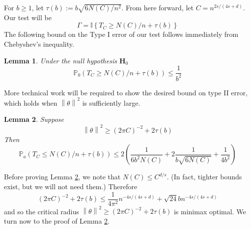 \documentclass{article}
\newcommand{\norm}[1]{\left\lVert#1\right\rVert}
\newcommand{\set}[1]{\left\{#1\right\}}
\newcommand{\1}{\mathbb{I}}
\newcommand{\Pbb}{\mathbb{P}}
\theoremstyle{alden}
\theoremstyle{aldenthm}
\newtheorem{lemma}{Lemma}
\theoremstyle{definition}
\theoremstyle{remark}
\begin{document}
For $b \geq 1$, let $\tau(b) := b \sqrt{6N(C)/n^2}$. From here forward, let $C = n^{2s/(4s + d)}$. Our test will be
\begin{equation*}
\Gamma = \1\set{T_C \geq N(C)/n + \tau(b)}
\end{equation*}
The following bound on the Type I error of our test follows immediately from Chebyshev's inequality.
\begin{lemma}
	Under the null hypothesis $\mathbf{H}_0$
	\begin{equation*}
	\Pbb_0(T_C \geq N(C)/n + \tau(b)) \leq \frac{1}{b^2}
	\end{equation*}
\end{lemma}

More technical work will be required to show the desired bound on type II error, which holds when $\norm{\theta}^2$ is sufficiently large.
\begin{lemma}
	\label{lem: type_2_error}
	Suppose
	\begin{equation*}
	\norm{\theta}^2 \geq (2\pi C)^{-2} + 2\tau(b)
	\end{equation*}
	Then
	\begin{equation*}
	\Pbb_{a}(T_C \leq N(C)/n + \tau(b)) \leq 2 \left(\frac{1}{6b^2N(C)} + 2\frac{1}{b\sqrt{6N(C)}} +  \frac{1}{4b^2}\right)
	\end{equation*}
\end{lemma}
Before proving Lemma \ref{lem: type_2_error}, we note that $N(C) \leq C^{d/s}$. (In fact, tighter bounds exist, but we will not need them.) Therefore
\begin{equation*}
(2\pi C)^{-2} + 2\tau(b) \leq \frac{1}{4\pi^2}n^{-4s/(4s + d)} + \sqrt{24}bn^{-4s/(4s + d)}
\end{equation*}
and so the critical radius $\norm{\theta}^2 \geq (2\pi C)^{-2} + 2\tau(b)$ is minimax optimal. We turn now to the proof of Lemma \ref{lem: type_2_error}.
\end{document}
